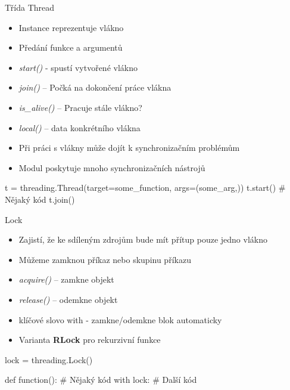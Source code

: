 \documentclass{beamer}
\begin{document}
\begin{frame}[fragile]{Třída Thread}
    \begin{itemize}
        \item Instance reprezentuje vlákno
        \item Předání funkce a argumentů
        \vskip 0.2in

        \item \textit{start()} - spustí vytvořené vlákno
        \item \textit{join()} – Počká na dokončení práce vlákna
        \item \textit{is\_alive()} – Pracuje stále vlákno?
        \item \textit{local()} – data konkrétního vlákna

        \vskip 0.2in
        \item Při práci s vlákny může dojít k synchronizačním problémům
        \item Modul poskytuje mnoho synchronizačních nástrojů
    \end{itemize}
    \scriptsize
    \begin{semiverbatim}
    t = threading.Thread(target=some_function, args=(some_arg,))
    t.start()
    # Nějaký kód
    t.join()
    \end{semiverbatim}
\end{frame}

\begin{frame}[fragile]{Lock}
    \begin{itemize}
            \item Zajistí, že ke sdíleným zdrojům bude mít přítup pouze jedno vlákno
            \item Můžeme zamknou příkaz nebo skupinu příkazu

            \vskip 0.15in
            \item \textit{acquire()} – zamkne objekt
            \item \textit{release()} – odemkne objekt
            \item klíčové slovo with - zamkne/odemkne blok automaticky

            \vskip 0.15in
            \item Varianta \textbf{RLock} pro rekurzivní funkce
    \end{itemize}
    \scriptsize
    \begin{semiverbatim}
    lock = threading.Lock()

    def function():
	    # Nějaký kód
	    with lock:  
	        # Další kód
    \end{semiverbatim}
\end{frame}
\end{document}
